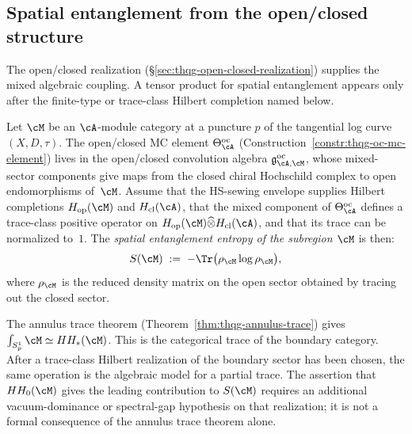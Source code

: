 %
%

\subsection{Spatial entanglement from the open/closed structure}
\label{subsec:thqg-entanglement-spatial}

The open/closed realization
(\S\ref{sec:thqg-open-closed-realization}) supplies the mixed
algebraic coupling.  A tensor product for spatial entanglement appears
only after the finite-type or trace-class Hilbert completion named
below.

\begin{conjecture}
\ClaimStatusConjectured
\label{conj:thqg-spatial-entanglement}
Let $\cM$ be an $\cA$-module category at a puncture $p$ of the
tangential log curve $(X, D, \tau)$. The open/closed MC element
$\Theta^{\mathrm{oc}}_\cA$
(Construction~\ref{constr:thqg-oc-mc-element})
lives in the open/closed convolution algebra
$\mathfrak{g}^{\mathrm{oc}}_{\cA, \cM}$,
whose mixed-sector components give maps from the closed
chiral Hochschild complex to open endomorphisms of~$\cM$.
Assume that the HS-sewing envelope supplies Hilbert completions
$H_{\mathrm{op}}(\cM)$ and $H_{\mathrm{cl}}(\cA)$, that the mixed
component of $\Theta^{\mathrm{oc}}_\cA$ defines a trace-class
positive operator on
$H_{\mathrm{op}}(\cM)\widehat{\otimes}H_{\mathrm{cl}}(\cA)$,
and that its trace can be normalized to~$1$.  The
\emph{spatial entanglement entropy of the subregion $\cM$} is then:
\begin{equation}\label{eq:thqg-spatial-entanglement}
S(\cM) \;:=\;
-\Tr\bigl(\rho_{\cM} \log \rho_{\cM}\bigr),
\end{equation}
where $\rho_{\cM}$ is the reduced density matrix on the open sector
obtained by tracing out the closed sector.
\end{conjecture}

\begin{remark}
\label{rem:thqg-annulus-as-partial-trace}
The annulus trace theorem (Theorem~\ref{thm:thqg-annulus-trace})
gives $\int_{S^1_p} \cM \simeq HH_*(\cM)$.
This is the categorical trace of the boundary category.  After a
trace-class Hilbert realization of the boundary sector has been
chosen, the same operation is the algebraic model for a partial
trace.  The assertion that $HH_0(\cM)$ gives the leading contribution
to $S(\cM)$ requires an additional vacuum-dominance or spectral-gap
hypothesis on that realization; it is not a formal consequence of
the annulus trace theorem alone.
\end{remark}

